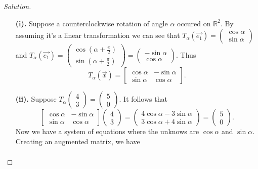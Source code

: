 \documentclass[ 12pt ]{article}
\begin{document}
\begin{enumerate}
	\begin{proof}[Solution]\renewcommand{\qedsymbol}{}
		\begin{enumerate}
			\item[\textbf{(i).}] Suppose a counterclockwise rotation of angle $\alpha$ occured on $\mathbb{R}^2$. By assuming it's a linear transformation we can see that
				$T_\alpha(\vec{e_1}) = \begin{pmatrix} \cos \alpha \\ \sin \alpha \end{pmatrix}$ and $T_\alpha(\vec{e_1}) = \begin{pmatrix} \cos \left (\alpha +
				\frac{\pi}{2}\right ) \\ \sin \left (\alpha + \frac{\pi}{2}\right ) \end{pmatrix} = \begin{pmatrix} -\sin \alpha \\ \cos \alpha \end{pmatrix}$. Thus
				$$T_\alpha(\vec{x}) = \begin{bmatrix} \cos \alpha & -\sin \alpha \\ \sin \alpha & \cos \alpha \end{bmatrix}.$$
			\item[\textbf{(ii).}] Suppose $T_\alpha \left (\begin{smallmatrix}4 \\ 3\end{smallmatrix} \right ) = \left (\begin{smallmatrix}5 \\ 0\end{smallmatrix} \right )$.
				It follows that $$\begin{bmatrix} \cos \alpha & -\sin \alpha \\ \sin \alpha & \cos \alpha \end{bmatrix} \begin{pmatrix}4 \\ 3\end{pmatrix} =
				\begin{pmatrix} 4\cos \alpha -3\sin \alpha \\ 3\cos \alpha + 4\sin \alpha \end{pmatrix} = \begin{pmatrix}5 \\ 0\end{pmatrix}.$$
				Now we have a system of equations where the unknows are $\cos \alpha$ and $\sin \alpha$. Creating an augmented matrix, we have
				\begin{align*}

\end{align*}
\end{enumerate}
\end{proof}
\end{enumerate}
\end{document}
